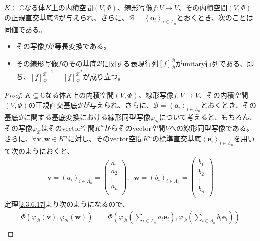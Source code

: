 \documentclass[dvipdfmx]{jsarticle}
\begin{document}
\begin{thm}\label{2.3.8.2}
$K \subseteq \mathbb{C}$なる体$K$上の内積空間$(V,\varPhi)$、線形写像$f:V \rightarrow V$、その内積空間$(V,\varPhi)$の正規直交基底$\mathcal{B}$が与えられ、さらに、$\mathcal{B}=\left\langle \mathbf{o}_{i} \right\rangle_{i \in \varLambda_{n}}$とおくとき、次のことは同値である。
\begin{itemize}
\item
  その写像$f$が等長変換である。
\item
  その線形写像$f$のその基底$\mathcal{B}$に関する表現行列$[ f]_{\mathcal{B}}^{\mathcal{B}}$がunitary行列である、即ち、${[ f]_{\mathcal{B}}^{\mathcal{B}}}^{- 1} = {[ f]_{\mathcal{B}}^{\mathcal{B}}}^{*}$が成り立つ。
\end{itemize}
\end{thm}
\begin{proof}
$K \subseteq \mathbb{C}$なる体$K$上の内積空間$(V,\varPhi)$、線形写像$f:V \rightarrow V$、その内積空間$(V,\varPhi)$の正規直交基底$\mathcal{B}$が与えられ、さらに、$\mathcal{B}=\left\langle \mathbf{o}_{i} \right\rangle_{i \in \varLambda_{n}}$とおくとき、その基底$\mathcal{B}$に関する基底変換における線形同型写像$\varphi_{\mathcal{B}}$について考えると、もちろん、その写像$\varphi_{\mathcal{B}}$はそのvector空間$K^{n}$からそのvector空間$V$への線形同型写像である。さらに、$\forall\mathbf{v},\mathbf{w} \in K^{n}$に対し、そのvector空間$K^{n}$の標準直交基底$\left\langle \mathbf{e}_{i} \right\rangle_{i \in \varLambda_{n}}$を用いて次のようにおくと、
\begin{align*}
\mathbf{v} = \left( a_{i} \right)_{i \in \varLambda_{n}} = \begin{pmatrix}
a_{1} \\
a_{2} \\
 \vdots \\
a_{n} \\
\end{pmatrix},\ \ \mathbf{w} = \left( b_{i} \right)_{i \in \varLambda_{n}} = \begin{pmatrix}
b_{1} \\
b_{2} \\
 \vdots \\
b_{n} \\
\end{pmatrix}
\end{align*}
定理\ref{2.3.6.17}より次のようになるので、
\begin{align*}
\varPhi\left( \varphi_{\mathcal{B}}\left( \mathbf{v} \right),\varphi_{\mathcal{B}}\left( \mathbf{w} \right) \right) &= \varPhi\left( \varphi_{\mathcal{B}}\left( \sum_{i \in \varLambda_{n}} {a_{i}\mathbf{e}_{i}} \right),\varphi_{\mathcal{B}}\left( \sum_{i \in \varLambda_{n}} {b_{i}\mathbf{e}_{i}} \right) \right)\\

\end{align*}
\end{proof}
\end{document}

